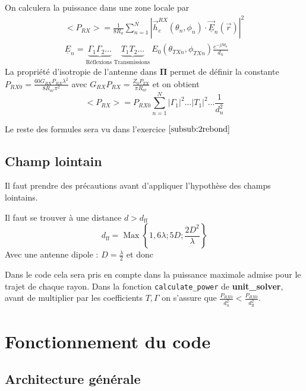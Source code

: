 \documentclass[sn-mathphys-num]{sn-jnl}
\begin{document}
    On calculera la puissance dans une zone locale par
    \begin{align}
        <P_{R X}>=\frac{1}{8 R_a} \sum_{n=1}^N\left|\vec{h}_e^{R X}\left(\theta_n, \phi_n\right) \cdot \underline{\vec{E}}_n(\vec{r})\right|^2\\
        \underline{E}_n=\underbrace{\Gamma_1 \Gamma_2 \ldots}_{\text {Réflexions }} \underbrace{T_1 T_2 \ldots}_{\text {Transmissions }} E_0\left(\theta_{T X n}, \phi_{T X n}\right) \frac{e^{-j \beta d_n}}{d_n}
    \end{align}
    La propriété d'isotropie de l'antenne dans $\mathbf{\Pi}$ permet de définir la constante $P_{RX0} = \frac{60 G_{RX}P_{RX} \lambda^2}{8 R_{ar} \pi^2}$ avec
    $G_{RX}P_{RX} = \frac{Z_0 P_{TX}}{\pi R_{ar}}$ et on obtient
    \begin{equation}
    \label{f:p_moy}
        <P_{RX}> = P_{RX0} \sum_{n=1}^N |\Gamma_1|^2 \dots |T_1|^2 \dots \frac{1}{d_n^2}
    \end{equation}

    Le reste des formules sera vu dans l'exercice $\ref{subsub:2rebond}$

    \subsection{Champ lointain}
    \label{sub:cl}

    Il faut prendre des précautions avant d'appliquer l'hypothèse des
    champs lointains. 

    Il faut se trouver à une distance $d > d_{\mathrm{ff}}$
    \begin{equation}
        d_{\mathrm{ff}}=\operatorname{Max}\left\{1,6 \lambda ; 5 D ; \frac{2 D^2}{\lambda}\right\}
    \end{equation}
    Avec une antenne dipole : $D = \frac{\lambda}{2}$ et donc 

    Dans le code cela sera pris en compte dans la puissance maximale
    admise pour le trajet de chaque rayon. 
    Dans la fonction \texttt{calculate\_power} de \textbf{unit\_solver},
    avant de multiplier par les coefficients $T, \Gamma$ on s'assure que 
    $\frac{P_{RX0}}{d_n^2} < \frac{P_{RX0}}{d_{\mathrm{ff}}^2}$.

 
\section{Fonctionnement du code}
\subsection{Architecture générale}
\end{document}
